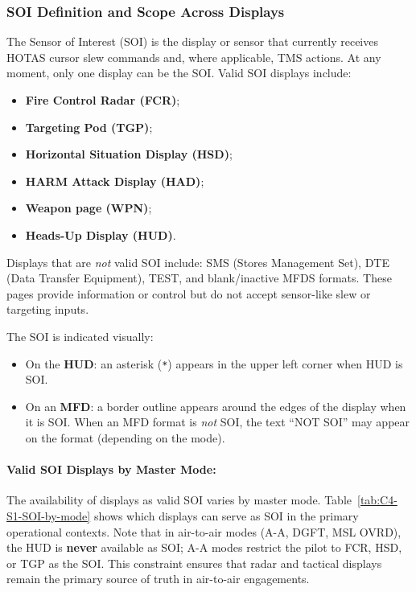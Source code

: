 \documentclass[11pt,a4paper]{article}
\begin{document}
\subsubsection{SOI Definition and Scope Across Displays}

\label{sec:C4-S1-S1}

The Sensor of Interest (SOI) is the display or sensor that currently receives HOTAS cursor slew commands and, where applicable, TMS actions. At any moment, only one display can be the SOI. Valid SOI displays include:

\begin{itemize}
    \item \textbf{Fire Control Radar (FCR)};
    \item \textbf{Targeting Pod (TGP)};
    \item \textbf{Horizontal Situation Display (HSD)};
    \item \textbf{HARM Attack Display (HAD)};
    \item \textbf{Weapon page (WPN)};
    \item \textbf{Heads-Up Display (HUD)}.
\end{itemize}

Displays that are \textit{not} valid SOI include: SMS (Stores Management Set), DTE (Data Transfer Equipment), TEST, and blank/inactive MFDS formats. These pages provide information or control but do not accept sensor-like slew or targeting inputs.

The SOI is indicated visually:
\begin{itemize}
    \item On the \textbf{HUD}: an asterisk (\texttt{*}) appears in the upper left corner when HUD is SOI.
    \item On an \textbf{MFD}: a border outline appears around the edges of the display when it is SOI. When an MFD format is \textit{not} SOI, the text ``NOT SOI'' may appear on the format (depending on the mode).
\end{itemize}

\paragraph{Valid SOI Displays by Master Mode:}
The availability of displays as valid SOI varies by master mode. Table~\ref{tab:C4-S1-SOI-by-mode} shows which displays can serve as SOI in the primary operational contexts. Note that in air-to-air modes (A-A, DGFT, MSL OVRD), the HUD is \textbf{never} available as SOI; A-A modes restrict the pilot to FCR, HSD, or TGP as the SOI. This constraint ensures that radar and tactical displays remain the primary source of truth in air-to-air engagements.
\end{document}
